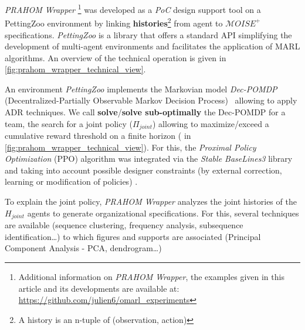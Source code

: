 \documentclass{ecai}
\begin{document}
\emph{PRAHOM Wrapper}\label{PettingZoo-wrapper}
\footnote{Additional information on \emph{PRAHOM Wrapper}, the examples given in this article and its developments are available at: \url{https://github.com/julien6/omarl_experiments}}
was developed as a \emph{PoC} design support tool on a PettingZoo environment by linking \textbf{histories}\footnote{A history is an n-tuple of (observation, action)} from agent to $\mathcal{M}OISE^+$ specifications. \emph{PettingZoo} is a library that offers a standard API simplifying the development of multi-agent environments and facilitates the application of MARL algorithms. An overview of the technical operation is given in \autoref{fig:prahom_wrapper_technical_view}.

An environment
\emph{PettingZoo} implements the Markovian model \emph{Dec-POMDP} (Decentralized-Partially Observable Markov Decision Process)~\cite{Oliehoek2016} allowing to apply
ADR techniques.
We call \textbf{solve}/\textbf{solve sub-optimally} the Dec-POMDP for a team, the search for a joint policy ($\Pi_{joint}$) allowing to maximize/exceed a cumulative reward threshold on a finite horizon ( in \autoref{fig:prahom_wrapper_technical_view}). For this, the \emph{Proximal Policy Optimization} (PPO) algorithm was integrated via the \emph{Stable BaseLines3} library and taking into account possible designer constraints (by external correction, learning or modification of policies) .


To explain the joint policy, \emph{PRAHOM Wrapper} analyzes the joint histories of the $H_{joint}$ agents to generate organizational specifications. For this, several techniques are available (sequence clustering, frequency analysis, subsequence identification\dots) to which figures and supports are associated (Principal Component Analysis - PCA, dendrogram\dots)
\end{document}
